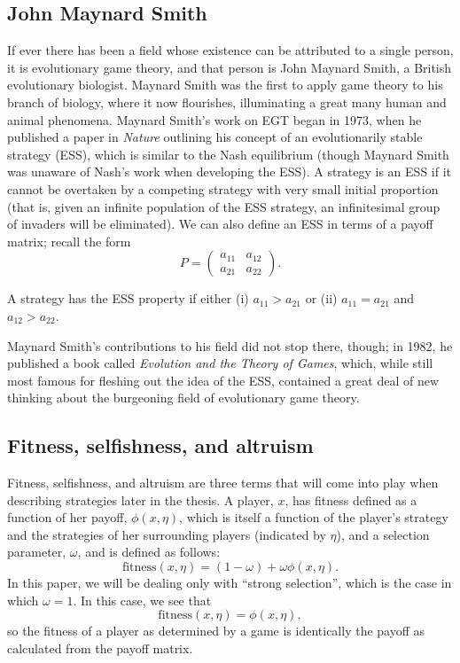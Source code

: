 \documentclass[notitlepage,reqno]{amsart}
\begin{document}
\subsection{John Maynard Smith}
If ever there has been a field whose existence can be attributed to a
single person, it is evolutionary game theory, and that person is John
Maynard Smith, a British evolutionary biologist. Maynard Smith was the
first to apply game theory to his branch of biology, where it now flourishes,
illuminating a great many human and animal phenomena. Maynard Smith's
work on EGT began in 1973, when he published a paper in
\emph{Nature} outlining his concept of an evolutionarily stable
strategy (ESS), which is similar to the Nash equilibrium (though
Maynard Smith was unaware of Nash's work when developing the ESS).
A strategy is an ESS if it cannot be overtaken by a competing strategy
with very small initial proportion (that is, given an infinite
population of the ESS strategy, an infinitesimal group of invaders
will be eliminated). We can also define an ESS in terms
of a payoff matrix; recall the form
\[
    P = 
\begin{pmatrix}
  a_{11} & a_{12} \\
  a_{21} & a_{22}
\end{pmatrix}.
\]

A strategy has the ESS property if either (i) $a_{11} > a_{21}$ or
(ii) $a_{11} = a_{21}$ and $a_{12} > a_{22}$.

Maynard Smith's contributions to his field did not stop there, though;
in 1982, he published a book called \emph{Evolution and the Theory of
  Games}, which, while still most famous for fleshing out the idea of
the ESS, contained a great deal of new thinking about the
burgeoning field of evolutionary game theory.

\subsection{Fitness, selfishness, and altruism}
Fitness, selfishness, and altruism are three terms that will come into
play when describing strategies later in the thesis. A player, $x$, has fitness defined as a function
of her payoff, $\phi(x, \eta)$, which is itself a function of the
player's strategy and the strategies of her surrounding players (indicated by
$\eta$), and a selection parameter, $\omega$, and is defined as follows:
\[
    \text{fitness}(x,\eta) = (1-\omega) + \omega\phi(x,\eta).
\]
In this paper, we will be dealing only with ``strong selection'',
which is the case in which $\omega = 1$. In this case, we see that
\[
    \text{fitness}(x,\eta) = \phi(x,\eta),
\]
so the fitness of a player as determined by a game is identically the
payoff as calculated from the payoff matrix.
\end{document}
